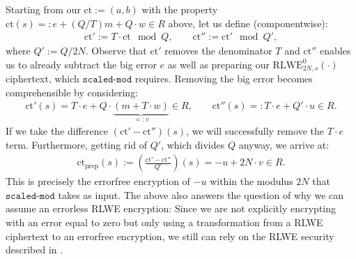 \documentclass[letterpaper,10pt,english]{jupyterBook}
\begin{document}
\sphinxAtStartPar
Starting from our \(\mathrm{ct} := (a,b)\) with the property \(\mathrm{ct}(s) =: e + (Q/T)m + Q \cdot w \in R\) above, let us define (component\sphinxhyphen{}wise):
\begin{equation*}
\begin{split}\mathrm{ct'} := T\cdot \mathrm{ct} \mod Q,\qquad \mathrm{ct''} := \mathrm{ct'} \mod Q',\end{split}
\end{equation*}
\sphinxAtStartPar
where \(Q' := Q/2N\).
Observe that \(\mathrm{ct'}\) removes the denominator \(T\) and \(\mathrm{ct''}\) enables us to already subtract the big error \(e\) as well as preparing our \(\mathrm{RLWE}_{2N,s}^0(\cdot)\) ciphertext, which \(\texttt{scaled-mod}\) requires.
Removing the big error becomes comprehensible by considering:
\begin{equation}\label{equation:Thesis:definition-of-u}
\begin{split}\mathrm{ct'}(s) = T\cdot e + Q\cdot \underbrace{(m+T\cdot w)}_{=: v} \in R, \qquad \mathrm{ct''}(s) =: T\cdot e + Q' \cdot u \in R.\end{split}
\end{equation}
\sphinxAtStartPar
If we take the difference \((\mathrm{ct'} - \mathrm{ct''})(s)\), we will successfully remove the \(T\cdot e\) term. Furthermore, getting rid of \(Q'\), which divides \(Q\) anyway, we arrive at:
\begin{equation*}
\begin{split}\mathrm{ct}_{\text{prep}}(s) := \left(\frac{\mathrm{ct'}-\mathrm{ct''}}{Q'}\right)(s) = -u + 2N \cdot v \in R.\end{split}
\end{equation*}
\sphinxAtStartPar
This is precisely the error\sphinxhyphen{}free encryption of \(-u\) within the modulus \(2N\) that \(\texttt{scaled-mod}\) takes as input.
The above also answers the question of why we can assume an errorless RLWE encryption:
Since we are not explicitly encrypting with an error equal to zero but only using a transformation from a RLWE ciphertext to an error\sphinxhyphen{}free encryption, we still can rely on the RLWE security described in {\hyperref[\detokenize{Thesis:security}]{}}.

\begin{DUlineblock}{0em}
\item[] 
\end{DUlineblock}
\end{document}
